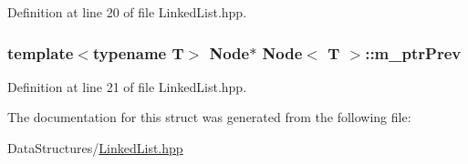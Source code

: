 Definition at line 20 of file Linked\+List.\+hpp.

\subsubsection[{\texorpdfstring{m\+\_\+ptr\+Prev}{m_ptrPrev}}]{\setlength{\rightskip}{0pt plus 5cm}template$<$typename T$>$ {\bf Node}$\ast$ {\bf Node}$<$ T $>$\+::m\+\_\+ptr\+Prev}\hypertarget{structNode_a4ac5c4812b8d0131789509c89d192ac5}{}\label{structNode_a4ac5c4812b8d0131789509c89d192ac5}


Definition at line 21 of file Linked\+List.\+hpp.



The documentation for this struct was generated from the following file\+:\begin{DoxyCompactItemize}
\item 
Data\+Structures/\hyperlink{LinkedList_8hpp}{Linked\+List.\+hpp}\end{DoxyCompactItemize}

